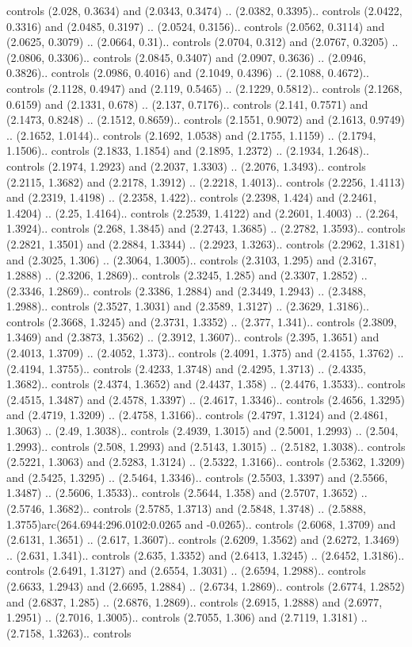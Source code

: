 controls (2.028, 0.3634) and (2.0343, 0.3474) .. (2.0382, 0.3395).. controls (2.0422, 0.3316) and (2.0485, 0.3197) .. (2.0524, 0.3156).. controls (2.0562, 0.3114) and (2.0625, 0.3079) .. (2.0664, 0.31).. controls (2.0704, 0.312) and (2.0767, 0.3205) .. (2.0806, 0.3306).. controls (2.0845, 0.3407) and (2.0907, 0.3636) .. (2.0946, 0.3826).. controls (2.0986, 0.4016) and (2.1049, 0.4396) .. (2.1088, 0.4672).. controls (2.1128, 0.4947) and (2.119, 0.5465) .. (2.1229, 0.5812).. controls (2.1268, 0.6159) and (2.1331, 0.678) .. (2.137, 0.7176).. controls (2.141, 0.7571) and (2.1473, 0.8248) .. (2.1512, 0.8659).. controls (2.1551, 0.9072) and (2.1613, 0.9749) .. (2.1652, 1.0144).. controls (2.1692, 1.0538) and (2.1755, 1.1159) .. (2.1794, 1.1506).. controls (2.1833, 1.1854) and (2.1895, 1.2372) .. (2.1934, 1.2648).. controls (2.1974, 1.2923) and (2.2037, 1.3303) .. (2.2076, 1.3493).. controls (2.2115, 1.3682) and (2.2178, 1.3912) .. (2.2218, 1.4013).. controls (2.2256, 1.4113) and (2.2319, 1.4198) .. (2.2358, 1.422).. controls (2.2398, 1.424) and (2.2461, 1.4204) .. (2.25, 1.4164).. controls (2.2539, 1.4122) and (2.2601, 1.4003) .. (2.264, 1.3924).. controls (2.268, 1.3845) and (2.2743, 1.3685) .. (2.2782, 1.3593).. controls (2.2821, 1.3501) and (2.2884, 1.3344) .. (2.2923, 1.3263).. controls (2.2962, 1.3181) and (2.3025, 1.306) .. (2.3064, 1.3005).. controls (2.3103, 1.295) and (2.3167, 1.2888) .. (2.3206, 1.2869).. controls (2.3245, 1.285) and (2.3307, 1.2852) .. (2.3346, 1.2869).. controls (2.3386, 1.2884) and (2.3449, 1.2943) .. (2.3488, 1.2988).. controls (2.3527, 1.3031) and (2.3589, 1.3127) .. (2.3629, 1.3186).. controls (2.3668, 1.3245) and (2.3731, 1.3352) .. (2.377, 1.341).. controls (2.3809, 1.3469) and (2.3873, 1.3562) .. (2.3912, 1.3607).. controls (2.395, 1.3651) and (2.4013, 1.3709) .. (2.4052, 1.373).. controls (2.4091, 1.375) and (2.4155, 1.3762) .. (2.4194, 1.3755).. controls (2.4233, 1.3748) and (2.4295, 1.3713) .. (2.4335, 1.3682).. controls (2.4374, 1.3652) and (2.4437, 1.358) .. (2.4476, 1.3533).. controls (2.4515, 1.3487) and (2.4578, 1.3397) .. (2.4617, 1.3346).. controls (2.4656, 1.3295) and (2.4719, 1.3209) .. (2.4758, 1.3166).. controls (2.4797, 1.3124) and (2.4861, 1.3063) .. (2.49, 1.3038).. controls (2.4939, 1.3015) and (2.5001, 1.2993) .. (2.504, 1.2993).. controls (2.508, 1.2993) and (2.5143, 1.3015) .. (2.5182, 1.3038).. controls (2.5221, 1.3063) and (2.5283, 1.3124) .. (2.5322, 1.3166).. controls (2.5362, 1.3209) and (2.5425, 1.3295) .. (2.5464, 1.3346).. controls (2.5503, 1.3397) and (2.5566, 1.3487) .. (2.5606, 1.3533).. controls (2.5644, 1.358) and (2.5707, 1.3652) .. (2.5746, 1.3682).. controls (2.5785, 1.3713) and (2.5848, 1.3748) .. (2.5888, 1.3755)arc(264.6944:296.0102:0.0265 and -0.0265).. controls (2.6068, 1.3709) and (2.6131, 1.3651) .. (2.617, 1.3607).. controls (2.6209, 1.3562) and (2.6272, 1.3469) .. (2.631, 1.341).. controls (2.635, 1.3352) and (2.6413, 1.3245) .. (2.6452, 1.3186).. controls (2.6491, 1.3127) and (2.6554, 1.3031) .. (2.6594, 1.2988).. controls (2.6633, 1.2943) and (2.6695, 1.2884) .. (2.6734, 1.2869).. controls (2.6774, 1.2852) and (2.6837, 1.285) .. (2.6876, 1.2869).. controls (2.6915, 1.2888) and (2.6977, 1.2951) .. (2.7016, 1.3005).. controls (2.7055, 1.306) and (2.7119, 1.3181) .. (2.7158, 1.3263).. controls 